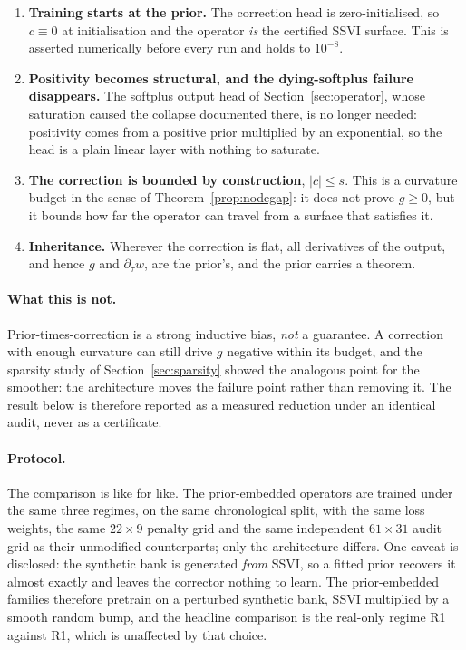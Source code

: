 \begin{enumerate}[label=(\roman*)]
\item \textbf{Training starts at the prior.} The correction head is zero-initialised, so
$c\equiv0$ at initialisation and the operator \emph{is} the certified SSVI surface. This is
asserted numerically before every run and holds to $10^{-8}$.
\item \textbf{Positivity becomes structural, and the dying-softplus failure disappears.} The
softplus output head of Section~\ref{sec:operator}, whose saturation caused the collapse
documented there, is no longer needed: positivity comes from a positive prior multiplied by an
exponential, so the head is a plain linear layer with nothing to saturate.
\item \textbf{The correction is bounded by construction}, $|c|\le s$. This is a curvature budget
in the sense of Theorem~\ref{prop:nodegap}: it does not prove $g\ge0$, but it bounds how far the
operator can travel from a surface that satisfies it.
\item \textbf{Inheritance.} Wherever the correction is flat, all derivatives of the output, and
hence $g$ and $\partial_\tau w$, are the prior's, and the prior carries a theorem.
\end{enumerate}

\paragraph{What this is not.} Prior-times-correction is a strong inductive bias, \emph{not} a
guarantee. A correction with enough curvature can still drive $g$ negative within its budget,
and the sparsity study of Section~\ref{sec:sparsity} showed the analogous point for the
smoother: the architecture moves the failure point rather than removing it. The result below is
therefore reported as a measured reduction under an identical audit, never as a certificate.

\paragraph{Protocol.} The comparison is like for like. The prior-embedded operators are trained
under the same three regimes, on the same chronological split, with the same loss weights,
the same $22\times9$ penalty grid and the same independent $61\times31$ audit grid as their
unmodified counterparts; only the architecture differs. One caveat is disclosed: the synthetic
bank is generated \emph{from} SSVI, so a fitted prior recovers it almost exactly and leaves the
corrector nothing to learn. The prior-embedded families therefore pretrain on a perturbed
synthetic bank, SSVI multiplied by a smooth random bump, and the headline comparison is the
real-only regime R1 against R1, which is unaffected by that choice.

